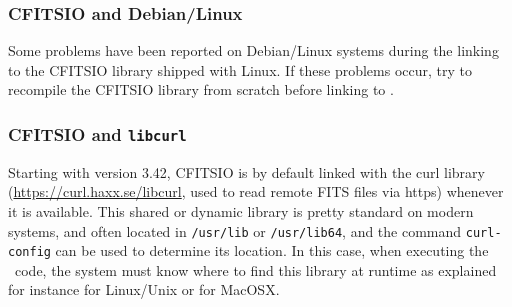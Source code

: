 \documentclass[12pt,twoside]{article}
\begin{document}
\subsubsection*{CFITSIO and Debian/Linux}
%
Some problems have been reported on Debian/Linux systems during the
linking to the CFITSIO library shipped with Linux. If these problems
occur, try to recompile the CFITSIO library from scratch before linking
to \healpix.

\subsubsection*{CFITSIO and \texttt{libcurl}}
\label{install:curl}
%
Starting with version 3.42, CFITSIO is by default linked with the 
curl library (\url{https://curl.haxx.se/libcurl},
used to read remote FITS files via https) whenever it is available.
This shared or dynamic library is pretty standard on modern systems, 
and often located in \texttt{/usr/lib} or \texttt{/usr/lib64}, and the command \texttt{curl-config} 
can be used to determine its location.
In this case, when executing the \healpix\ code, 
the system must know where to find this library at runtime as explained for instance 
for Linux/Unix or 
 for MacOSX.




\end{document}
